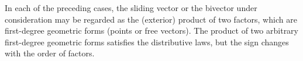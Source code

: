 In each of the preceding cases, the sliding vector or the bivector under consideration may be regarded as the (exterior) product of two factors, which are first-degree geometric forms (points or free vectors). The product of two arbitrary first-degree geometric forms satisfies the distributive laws, but the sign changes with the order of factors.

